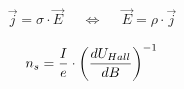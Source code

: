 
\begin{align}
	\vec{j} = \sigma \cdot \vec{E} & & \Leftrightarrow & & \vec{E} = \rho \cdot \vec{j}
	\label{eq:u2rho}
\end{align}

\begin{equation}
	n_s=\frac{I}{e} \cdot \left( \frac{d U_{Hall}}{d B} \right)^{-1}
	\label{eq:ladungsdichte_steig}
\end{equation}